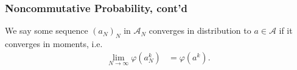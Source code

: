 \documentclass{beamer}
\begin{document}
\begin{frame}
  \frametitle{Noncommutative Probability, cont'd}
  We say some sequence $\left( a_N \right)_{N}$ in $\mathcal{A}_N$ converges in distribution to $a\in \mathcal{A}$ if it converges in moments, i.e.
  \begin{align*}
    \lim_{N\rightarrow\infty}\varphi\left( a_N^{k} \right) &= \varphi\left( a^k \right).
  \end{align*}
\end{frame}
\end{document}
